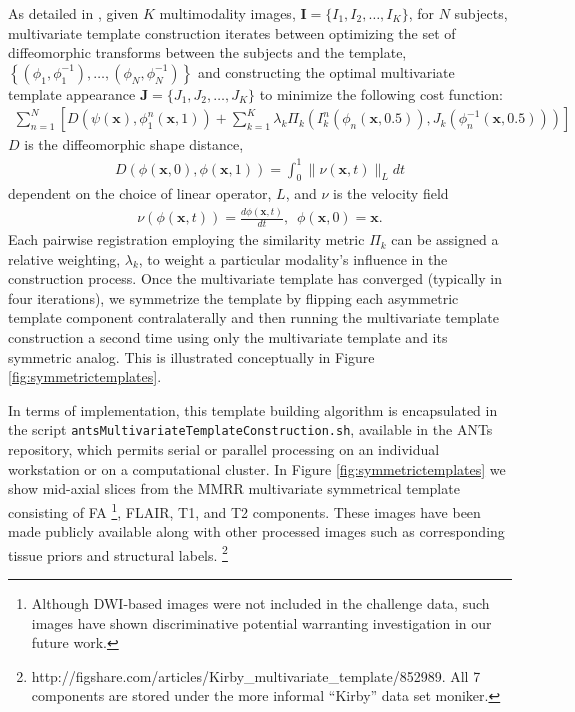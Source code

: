 \documentclass[preprint,authoryear,review,12pt]{elsarticle}
\begin{document}
As detailed in \cite{avants2008,avants2010}, 
given $K$ multimodality images, ${\mathbf I} = \{I_1,I_2,\ldots, I_K\}$, 
for $N$ subjects,  multivariate 
template construction iterates between optimizing the set 
of diffeomorphic transforms between the subjects and the 
template, 
$\left\{\left(\phi_1,\phi_1^{-1}\right),\ldots,\left(\phi_N,\phi_N^{-1}\right)\right\}$ 
and constructing the 
optimal multivariate template appearance 
$\mathbf{J}=\{J_1,J_2,\ldots, J_K\}$ to minimize the
following cost function:
\begin{align}
  \sum_{n=1}^N 
        \left[ D \left( \psi(\mathbf{x}),\phi_1^n(\mathbf{x},1)\right)  
        + \sum_{k=1}^K \lambda_k \Pi_k \left(I_k^n\left(\phi_n(\mathbf{x},0.5)\right),J_k\left(\phi^{-1}_n(\mathbf{x},0.5)\right)\right)\right]
\end{align}
$D$ is the diffeomorphic shape distance,
\begin{align}
D\left( \phi( \mathbf{x},0),\phi( \mathbf{x},1)\right) = \int_0^1 \| \nu(\mathbf{x},t)\|_L dt
\end{align}
dependent on the choice of linear operator, $L$, and $\nu$
is the velocity field
\begin{align}
\nu\left( \phi(\mathbf{x},t) \right) = \frac{d\phi(\mathbf{x},t)}{dt},\,\,\, \phi(\mathbf{x},0) = \mathbf{x}.
\end{align}
Each pairwise registration employing the similarity metric $\Pi_k$ can 
be assigned a relative weighting, $\lambda_k$, to weight a particular
modality's influence in the construction process.  Once the multivariate
template has converged (typically in four iterations), we symmetrize
the template by flipping each asymmetric template component contralaterally 
and then running the
multivariate template construction a second time using only the multivariate
template and its symmetric analog.  This is illustrated conceptually in
Figure \ref{fig:symmetrictemplates}.

In terms of implementation, this template building algorithm is 
encapsulated in the script \verb#antsMultivariateTemplateConstruction.sh#,
available in the ANTs repository, which permits serial or parallel processing on
an individual workstation or on a computational cluster.  In
Figure \ref{fig:symmetrictemplates} we show mid-axial slices from
the MMRR multivariate symmetrical template consisting of FA%
\footnote{
Although DWI-based images were not included in the
challenge data, such images have shown discriminative potential 
\citep{price2003,cha2005} warranting investigation in our future
work.  
}, FLAIR,  
T1, and T2 components.  These images have been made publicly available
along with other processed images such as corresponding
tissue priors and structural labels.%
\footnote{
http://figshare.com/articles/Kirby\_multivariate\_template/852989.
All 7 components are stored under the more informal ``Kirby'' data set moniker.
}
\end{document}
